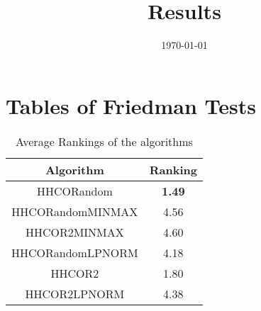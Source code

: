 \documentclass{article}
\title{Results}
\author{}
\date{\today}
\begin{document}
\oddsidemargin 0in \topmargin 0in\maketitle
\section{Tables of Friedman Tests}
\begin{table}[!htp]
\centering
\caption{Average Rankings of the algorithms
}\begin{tabular}{|c|c|}
\hline
Algorithm&Ranking\\
\hline
HHCORandom& {\bf 1.49}\\\hline
HHCORandomMINMAX&4.56\\\hline
HHCOR2MINMAX&4.60\\\hline
HHCORandomLPNORM&4.18\\\hline
HHCOR2&1.80\\\hline
HHCOR2LPNORM&4.38\\\hline
\end{tabular}
\end{table}
\end{document}

